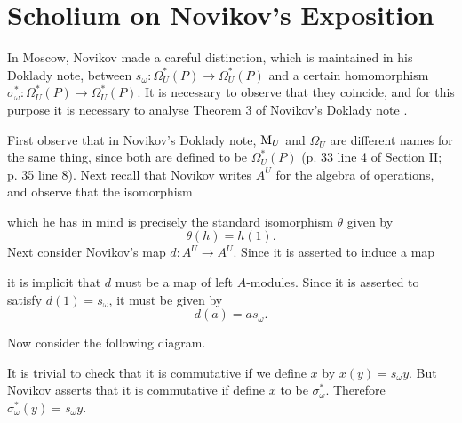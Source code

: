 \documentclass[../main]{subfiles}
\begin{document}
\label{sec:p1c7}


\chapter{Scholium on Novikov's Exposition}

In Moscow, Novikov made a careful distinction, which is maintained in his Doklady note, between $s_{\omega}\colon\Omega_U^{\ast}(P)\longrightarrow\Omega_U^{\ast}(P)$ and a certain homomorphism \newline $\sigma_{\omega}^{\ast}\colon\Omega_U^{\ast}(P)\longrightarrow\Omega_U^{\ast}(P)$. It is necessary to observe that they coincide, and for this purpose it is necessary to analyse Theorem 3 of Novikov's Doklady note \cite{novikov2}. %

First observe that in Novikov's Doklady note, $\mathrm{M}_U$ and $\Omega_U$ are different names for the same thing, since both are defined to be $\Omega_U^{\ast}(P)$ (p. 33 line 4 of Section II; p. 35 line 8). Next recall that Novikov writes $A^U$ for the algebra of operations, and observe that the isomorphism 
\begin{center}
\end{center}
which he has in mind is precisely the standard isomorphism $\theta$ given by
\begin{equation*}
    \theta(h)=h(1).
\end{equation*}
Next consider Novikov's map $d\colon A^U\longrightarrow A^U$. Since it is asserted to induce a map
\begin{center}
\end{center}
it is implicit that $d$ must be a map of left $A$-modules. Since it is asserted to satisfy $d(1)=s_{\omega}$, it must be given by
\begin{equation*}
    d(a)=as_{\omega}.
\end{equation*}

Now consider the following diagram.
\begin{center}
\end{center}

It is trivial to check that it is commutative if we define $x$ by $x(y)=s_{\omega}y$. But Novikov asserts that it is commutative if define $x$ to be $\sigma_{\omega}^{\ast}$. Therefore $\sigma_{\omega}^{\ast}(y)=s_{\omega}y$.
\end{document}
